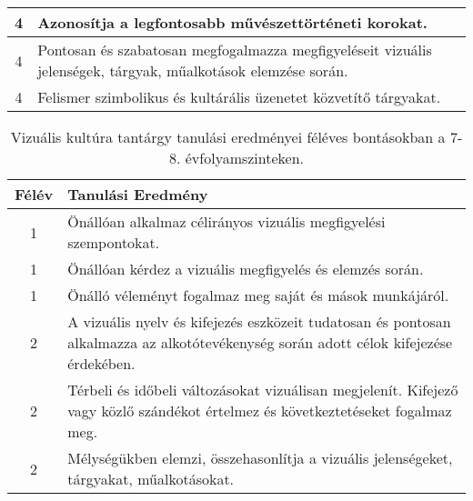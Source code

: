 \begin{longtable}{c | p{12cm} }
                                
                                          4 &  Azonosítja a legfontosabb művészettörténeti korokat. \\ \hline
                                          4 &  Pontosan és szabatosan megfogalmazza megfigyeléseit vizuális jelenségek, tárgyak, műalkotások elemzése során. \\ \hline
                                          4 &  Felismer szimbolikus és kultárális üzenetet közvetítő tárgyakat. \\ \hline
                                      
                        \end{longtable}
            \clearpage

       
           \begin{longtable}{c | p{12cm} }
            \caption[Vizuális kultúra 7-8.]{Vizuális kultúra tantárgy tanulási eredményei féléves bontásokban a 7-8. évfolyamszinteken. }  \\

            \textbf{Félév} & \textbf{Tanulási Eredmény} \\
            \hline
            \endhead
                                
                                          1 &  Önállóan alkalmaz célirányos vizuális megfigyelési szempontokat. \\ \hline
                                          1 &  Önállóan kérdez a vizuális megfigyelés és elemzés során. \\ \hline
                                          1 &  Önálló véleményt fogalmaz meg saját és mások munkájáról. \\ \hline
                                      
                                
                                          2 &  A vizuális nyelv és kifejezés eszközeit tudatosan és pontosan alkalmazza az alkotótevékenység során adott célok kifejezése érdekében. \\ \hline
                                          2 &  Térbeli és időbeli változásokat vizuálisan megjelenít. Kifejező vagy közlő szándékot értelmez és következtetéseket fogalmaz meg. \\ \hline
                                          2 &  Mélységükben elemzi, összehasonlítja a vizuális jelenségeket, tárgyakat, műalkotásokat. \\ \hline
                                      

\end{longtable}

